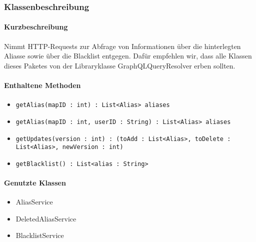 \subsubsection*{Klassenbeschreibung}%
\paragraph*{Kurzbeschreibung}
Nimmt HTTP-Requests zur Abfrage von Informationen über die hinterlegten Aliasse sowie über die Blacklist entgegen.
Dafür empfehlen wir, dass alle Klassen dieses Paketes von der Libraryklasse \dq GraphQLQueryResolver \dq erben sollten.
\paragraph*{Enthaltene Methoden}
\begin{itemize}
    \item \texttt{getAlias(mapID : int) : List<Alias> aliases}
    \item \texttt{getAlias(mapID : int, userID : String) : List<Alias> aliases}
    \item \texttt{getUpdates(version : int) : (toAdd : List<Alias>, toDelete : List<Alias>, newVersion : int)}
    \item \texttt{getBlacklist() : List<alias : String>}
\end{itemize}
\paragraph*{Genutzte Klassen}
\begin{itemize}
    \item AliasService
    \item DeletedAliasService
    \item BlacklistService
\end{itemize}